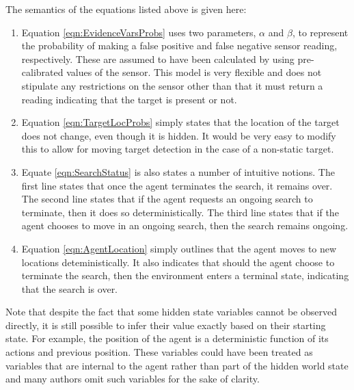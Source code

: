\normalsize
The semantics of the equations listed above is given here: 
\begin{enumerate}
    \item Equation \ref{eqn:EvidenceVarsProbs} uses two parameters, $\alpha$ and $\beta$, to represent the probability of making a false positive and false negative sensor reading, respectively. These are assumed to have been calculated by using pre-calibrated values of the sensor. This model is very flexible and does not stipulate any restrictions on the sensor other than that it must return a reading indicating that the target is present or not.
    \item  Equation \ref{eqn:TargetLocProbs} simply states that the location of the target does not change, even though it is hidden. It would be very easy to modify this to allow for moving target detection in the case of a non-static target.
    \item Equate \ref{eqn:SearchStatus} is also states a number of intuitive notions. The first line states that once the agent terminates the search, it remains over. The second line states that if the agent requests an ongoing search to terminate, then it does so deterministically. The third line states that if the agent chooses to move in an ongoing search, then the search remains ongoing.
    \item Equation \ref{eqn:AgentLocation} simply outlines that the agent moves to new locations deteministically. It also indicates that should the agent choose to terminate the search, then the environment enters a terminal state, indicating that the search is over.
\end{enumerate}


Note that despite the fact that some hidden state variables cannot be observed directly, it is still possible to infer their value exactly based on their starting state. For example, the position of the agent is a deterministic function of its actions and previous position. These variables could have been treated as variables that are internal to the agent rather than part of the hidden world state and many authors omit such variables for the sake of clarity.
